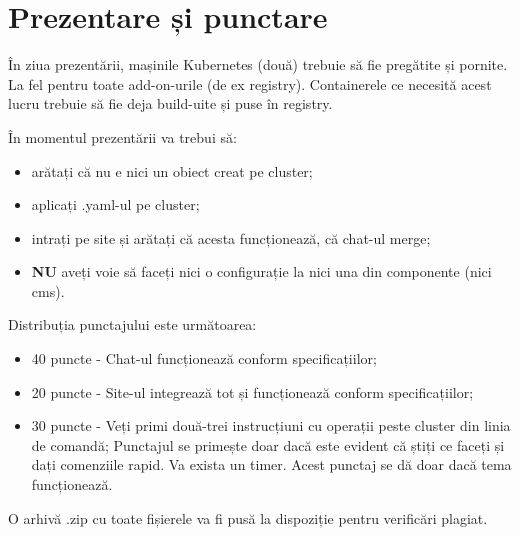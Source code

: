 \documentclass{article}
\newcounter{ProblemCounter} %
\newcommand{\ProblemName}{}
\newenvironment{Problem}[1][Sectiunea \arabic{ProblemCounter}]{ %
\stepcounter{ProblemCounter} %
\renewcommand{\ProblemName}{#1} %
\section{\ProblemName} %
}{}
\begin{document}
\begin{Problem}[Prezentare și punctare]

În ziua prezentării, mașinile Kubernetes (două) trebuie să fie pregătite și pornite. La fel pentru toate add-on-urile (de ex registry). Containerele ce necesită acest lucru trebuie să fie deja build-uite și puse în registry.

În momentul prezentării va trebui să:
\begin{itemize}
    \item arătați că nu e nici un obiect creat pe cluster;
    \item aplicați .yaml-ul pe cluster;
    \item intrați pe site și arătați că acesta funcționează, că chat-ul merge;
    \item \textbf{NU} aveți voie să faceți nici o configurație la nici una din componente (nici cms).
\end{itemize}

    Distribuția punctajului este următoarea:
\begin{itemize}
    \item 40 puncte - Chat-ul funcționează conform specificațiilor;
    \item 20 puncte - Site-ul integrează tot și funcționează conform specificațiilor;
    \item 30 puncte - Veți primi două-trei instrucțiuni cu operații peste cluster din linia de comandă; Punctajul se primește doar dacă este evident că știți ce faceți și dați comenziile rapid. Va exista un timer. Acest punctaj se dă doar dacă tema funcționează.
\end{itemize}

O arhivă .zip cu toate fișierele va fi pusă la dispoziție pentru verificări plagiat.

\end{Problem}
\end{document}
